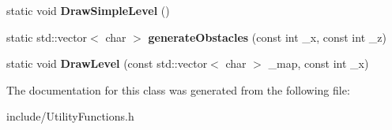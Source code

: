 \begin{DoxyCompactItemize}
\item 
static void {\bfseries Draw\+Simple\+Level} ()\hypertarget{classutilityFunctions_aaf022cdf38d307c95c80fc3edde6021b}{}\label{classutilityFunctions_aaf022cdf38d307c95c80fc3edde6021b}

\item 
static std\+::vector$<$ char $>$ {\bfseries generate\+Obstacles} (const int \+\_\+x, const int \+\_\+z)\hypertarget{classutilityFunctions_a38938fe92753e93d58de256b1b7c77a5}{}\label{classutilityFunctions_a38938fe92753e93d58de256b1b7c77a5}

\item 
static void {\bfseries Draw\+Level} (const std\+::vector$<$ char $>$ \+\_\+map, const int \+\_\+x)\hypertarget{classutilityFunctions_a8b846904f8090abc4fa16e99a6e8ff3a}{}\label{classutilityFunctions_a8b846904f8090abc4fa16e99a6e8ff3a}

\end{DoxyCompactItemize}


The documentation for this class was generated from the following file\+:\begin{DoxyCompactItemize}
\item 
include/Utility\+Functions.\+h\end{DoxyCompactItemize}
